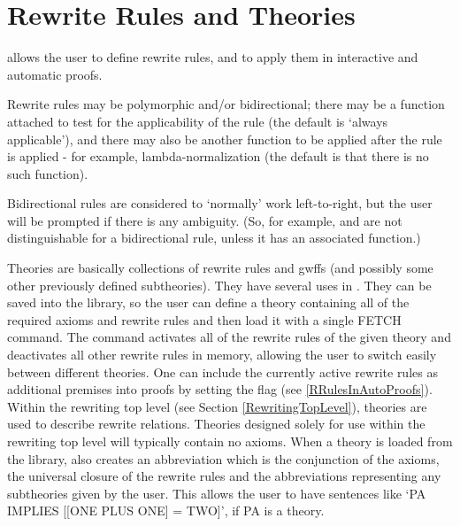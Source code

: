 \chapter{Rewrite Rules and Theories}
\label{rewrite}

{\TPS} allows the user to define rewrite rules, and to apply them in interactive and automatic proofs.

Rewrite rules may be polymorphic and/or bidirectional; there may be a function attached to test for
the applicability of the rule (the default is `always applicable'), and there may also be another function
to be applied after the rule is applied - for example, lambda-normalization
(the default is that there is no such function).

Bidirectional rules are considered to `normally' work left-to-right, but
the user will be prompted if there is any ambiguity. (So, for example,
 and  are not
distinguishable for a bidirectional rule, unless it has an associated function.)

Theories are basically collections of rewrite rules and gwffs (and possibly some other previously defined subtheories).
They have %
several uses in {\TPS}.
They can be saved into the library, so the user can define a theory containing all of
the required axioms and rewrite rules and then load it with a single FETCH command.
The command  activates all of the rewrite rules of the
given theory and deactivates all other rewrite rules in memory, allowing the user to switch
easily between different theories.
One can include the currently active rewrite rules as additional premises into
proofs by setting the flag  (see
\ref{RRulesInAutoProofs}).
Within the rewriting top level (see Section \ref{RewritingTopLevel}), theories
are used to describe rewrite relations. Theories designed solely for use within
the rewriting top level will typically contain no axioms.
When a theory is loaded from the library, {\TPS} also creates an abbreviation
which is the conjunction of the axioms, the universal
closure of the rewrite rules and the abbreviations representing any subtheories
given by the user. This allows the user to have sentences like
`PA IMPLIES [[ONE PLUS ONE] = TWO]', if PA is a theory.


